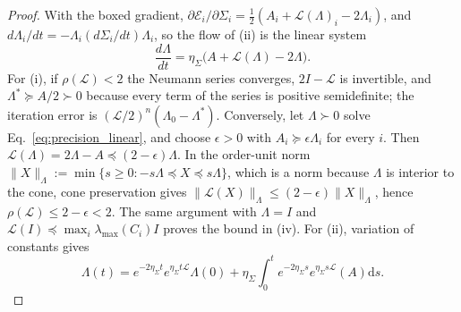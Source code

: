 \begin{proof}
With the boxed gradient, $\partial\mathcal{E}_i/\partial\Sigma_i = \tfrac{1}{2}(A_i + \mathcal{L}(\Lambda)_i - 2\Lambda_i)$, and $d\Lambda_i/dt = -\Lambda_i(d\Sigma_i/dt)\Lambda_i$, so the flow of (ii) is the linear system
\begin{equation}
\frac{d\Lambda}{dt} = \eta_\Sigma\big(A + \mathcal{L}(\Lambda) - 2\Lambda\big).
\label{eq:precision_flow}
\end{equation}
For (i), if $\rho(\mathcal{L}) < 2$ the Neumann series converges, $2I - \mathcal{L}$ is invertible, and $\Lambda^* \succeq A/2 \succ 0$ because every term of the series is positive semidefinite; the iteration error is $(\mathcal{L}/2)^n(\Lambda_0 - \Lambda^*)$. Conversely, let $\Lambda \succ 0$ solve Eq.~\eqref{eq:precision_linear}, and choose $\epsilon > 0$ with $A_i \succeq \epsilon\Lambda_i$ for every $i$. Then $\mathcal{L}(\Lambda) = 2\Lambda - A \preceq (2-\epsilon)\Lambda$. In the order-unit norm $\|X\|_\Lambda := \min\{s \geq 0 : -s\Lambda \preceq X \preceq s\Lambda\}$, which is a norm because $\Lambda$ is interior to the cone, cone preservation gives $\|\mathcal{L}(X)\|_\Lambda \leq (2-\epsilon)\|X\|_\Lambda$, hence $\rho(\mathcal{L}) \leq 2 - \epsilon < 2$. The same argument with $\Lambda = I$ and $\mathcal{L}(I) \preceq \max_i\lambda_{\max}(C_i) I$ proves the bound in (iv). For (ii), variation of constants gives
\[
\Lambda(t) = e^{-2\eta_\Sigma t}e^{\eta_\Sigma t\mathcal{L}}\Lambda(0) + \eta_\Sigma\int_0^t e^{-2\eta_\Sigma s}e^{\eta_\Sigma s\mathcal{L}}(A)\mathrm{d}s.
\]

\end{proof}
